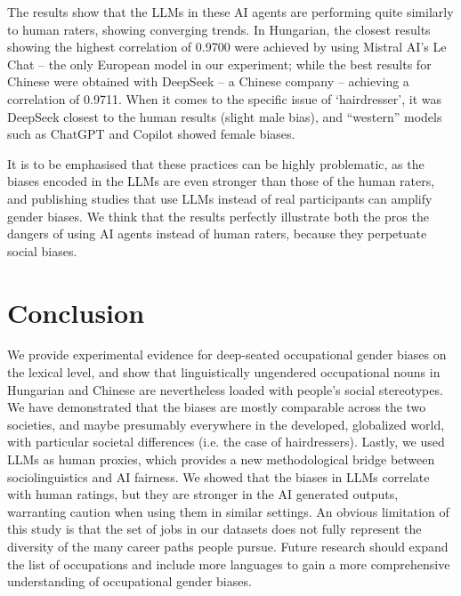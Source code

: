 \documentclass[runningheads]{llncs}
\newcommand{\zh}[1]{\simplifiedchinesefont{#1}\rmfamily}
\begin{document}
The results show that the LLMs in these AI agents are performing quite similarly to human raters, showing converging trends. In Hungarian, the closest results showing the highest correlation of 0.9700 were achieved by using Mistral AI's Le Chat -- the only European model in our experiment; while the best results for Chinese were obtained with DeepSeek -- a Chinese company -- achieving a correlation of 0.9711. When it comes to the specific issue of \zh{理发师} `hairdresser', it was DeepSeek closest to the human results (slight male bias), and ``western'' models such as ChatGPT and Copilot showed female biases.

It is to be emphasised that these practices can be highly problematic, as the biases encoded in the LLMs are even stronger than those of the human raters, and publishing studies that use LLMs instead of real participants can amplify gender biases. We think that the results perfectly illustrate both the pros the dangers of using AI agents instead of human raters, because they perpetuate social biases.

\section{Conclusion}

We provide experimental evidence for deep-seated occupational gender biases on the lexical level, and show that linguistically ungendered occupational nouns in Hungarian and Chinese are nevertheless loaded with people's social stereotypes. We have demonstrated that the biases are mostly comparable across the two societies, and maybe presumably everywhere in the developed, globalized world, with particular societal differences (i.e. the case of hairdressers). Lastly, we used LLMs as human proxies, which provides a new methodological bridge between sociolinguistics and AI fairness. We showed that the biases in LLMs correlate with human ratings, but they are stronger in the AI generated outputs, warranting caution when using them in similar settings. An obvious limitation of this study is that the set of jobs in our datasets does not fully represent the diversity of the many career paths people pursue. Future research should expand the list of occupations and include more languages to gain a more comprehensive understanding of occupational gender biases.

\end{document}
